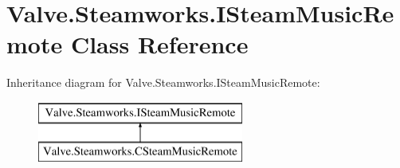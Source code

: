 \hypertarget{classValve_1_1Steamworks_1_1ISteamMusicRemote}{}\section{Valve.\+Steamworks.\+I\+Steam\+Music\+Remote Class Reference}
\label{classValve_1_1Steamworks_1_1ISteamMusicRemote}
Inheritance diagram for Valve.\+Steamworks.\+I\+Steam\+Music\+Remote\+:\begin{figure}[H]
\begin{center}
\leavevmode
\includegraphics[height=2.000000cm]{classValve_1_1Steamworks_1_1ISteamMusicRemote}
\end{center}
\end{figure}
